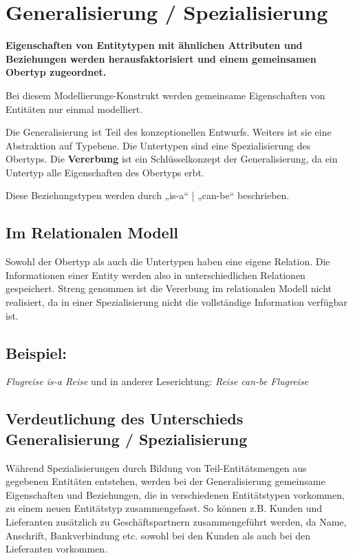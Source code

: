 \section{Generalisierung / Spezialisierung}

\textbf{Eigenschaften von Entitytypen mit ähnlichen Attributen und Beziehungen werden herausfaktorisiert und einem gemeinsamen Obertyp zugeordnet.}

Bei diesem Modellierungs-Konstrukt werden gemeinsame Eigenschaften von Entitäten nur einmal modelliert.

Die Generalisierung ist Teil des konzeptionellen Entwurfs. Weiters ist sie eine Abstraktion auf Typebene. Die Untertypen sind eine Spezialisierung des Obertyps. Die \textbf{Vererbung} ist ein Schlüsselkonzept der Generalisierung, da ein Untertyp alle Eigenschaften des Obertyps erbt.

Diese Beziehungstypen werden durch „is-a“ | „can-be“ beschrieben.

\subsection{Im Relationalen Modell}

Sowohl der Obertyp als auch die Untertypen haben eine eigene Relation. Die Informationen einer Entity werden also in unterschiedlichen Relationen gespeichert. Streng genommen ist die Vererbung im relationalen Modell nicht realisiert, da in einer Spezialisierung nicht die vollständige Information verfügbar ist.

\subsection{Beispiel:}
\textit{Flugreise is-a Reise} \newline
 	und in anderer Leserichtung: \newline
\textit{Reise can-be Flugreise}

\subsection{Verdeutlichung des Unterschieds Generalisierung / Spezialisierung}

Während Spezialisierungen durch Bildung von Teil-Entitätsmengen aus gegebenen Entitäten entstehen, werden bei der Generalisierung gemeinsame Eigenschaften und Beziehungen, die in verschiedenen Entitätstypen vorkommen, zu einem neuen Entitätstyp zusammengefasst. So können z.B. Kunden und Lieferanten zusätzlich zu Geschäftspartnern zusammengeführt werden, da Name, Anschrift, Bankverbindung etc. sowohl bei den Kunden als auch bei den Lieferanten vorkommen.

